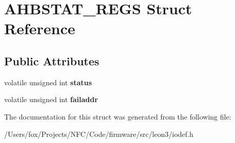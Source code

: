 \hypertarget{struct_a_h_b_s_t_a_t___r_e_g_s}{
\section{AHBSTAT\_\-REGS Struct Reference}
\label{struct_a_h_b_s_t_a_t___r_e_g_s}
}
\subsection*{Public Attributes}
\begin{DoxyCompactItemize}
\item 
\hypertarget{struct_a_h_b_s_t_a_t___r_e_g_s_abadfb008f492d5777c5bfeb2a55967a9}{
volatile unsigned int {\bfseries status}}
\label{struct_a_h_b_s_t_a_t___r_e_g_s_abadfb008f492d5777c5bfeb2a55967a9}

\item 
\hypertarget{struct_a_h_b_s_t_a_t___r_e_g_s_a8d7dc463024535545e6ba2fef4ff2e06}{
volatile unsigned int {\bfseries failaddr}}
\label{struct_a_h_b_s_t_a_t___r_e_g_s_a8d7dc463024535545e6ba2fef4ff2e06}

\end{DoxyCompactItemize}


The documentation for this struct was generated from the following file:\begin{DoxyCompactItemize}
\item 
/Users/fox/Projects/NFC/Code/firmware/src/leon3/iodef.h\end{DoxyCompactItemize}

